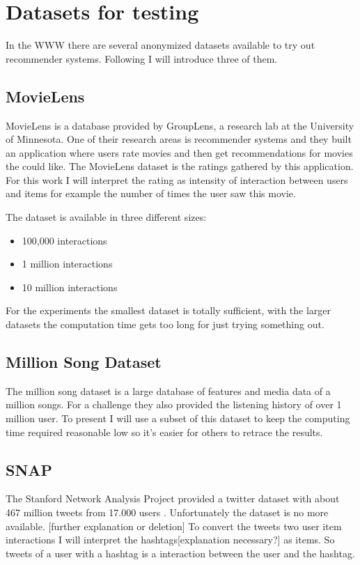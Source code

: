 \section{Datasets for testing}

In the WWW there are several anonymized datasets available to try
out recommender systems. Following I will introduce three of them.


\subsection{MovieLens}
\label{movielens}

MovieLens\cite{movielensdatasets} is a database provided by GroupLens, a research
lab at the University of Minnesota. One of their research areas is
recommender systems and they built an application where users rate
movies and then get recommendations for movies the could like. The
MovieLens dataset is the ratings gathered by this application. For
this work I will interpret the rating as intensity of interaction
between users and items for example the number of times the user saw
this movie.

The dataset is available in three different sizes:
\begin{itemize}
\item 100,000 interactions
\item 1 million interactions
\item 10 million interactions
\end{itemize}
For the experiments the smallest dataset is totally sufficient, with
the larger datasets the computation time gets too long for just trying
something out.


\subsection{Million Song Dataset}
The million song dataset\cite{Bertin-Mahieux2011} is a large database of features and media data
of a million songs. For a challenge they also provided the listening history of over 1 million
user. To present I will use a subset of this dataset to keep the computing time required
reasonable low so it's easier for others to retrace the results.


\subsection{SNAP}
The Stanford Network Analysis Project provided a twitter dataset with about 467 million tweets from 17.000 users
\cite{snap}.
Unfortunately the dataset is no more available. [further explanation or deletion]
To convert the tweets two user item interactions I will interpret the hashtags[explanation necessary?] as items.
So tweets of a user with a hashtag is a interaction between the user and the hashtag.
